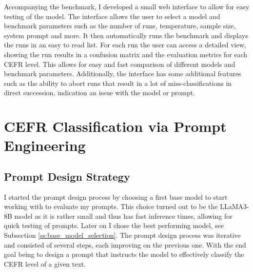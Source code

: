 Accompanying the benchmark, I developed a small web interface to allow for easy testing of the model. The interface allows the user to select a model and benchmark parameters such as the number of runs, temperature, sample size, system prompt and more. It then automatically runs the benchmark and displays the runs in an easy to read list. For each run the user can access a detailed view, showing the run results in a confusion matrix and the evaluation metrics for each CEFR level. This allows for easy and fast comparison of different models and benchmark parameters. Additionally, the interface has some additional features such as the ability to abort runs that result in a lot of miss-classifications in direct succession, indication an issue with the model or prompt. \\


\section{CEFR Classification via Prompt Engineering}
\label{s:prompt_engineering}
\subsection{Prompt Design Strategy}
\label{ss:prompt_design}
I started the prompt design process by choosing a first base model to start working with to evaluate my prompts. This choice turned out to be the LLaMA3-8B model \citep{LLaMA3} as it is rather small and thus has fast inference times, allowing for quick testing of prompts. Later on I chose the best performing model, see Subsection \ref{ss:base_model_selection}. The prompt design process was iterative and consisted of several steps, each improving on the previous one. With the end goal being to design a prompt that instructs the model to effectively classify the CEFR level of a given text.

